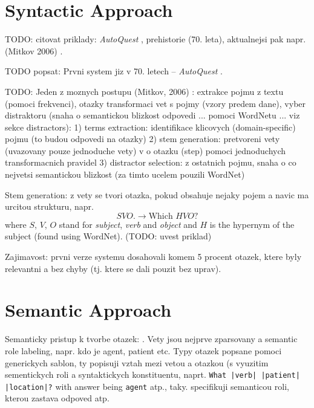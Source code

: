 \documentclass[a4paper, 12pt, twoside]{fithesis2}		%
\renewcommand{\_}{\leavevmode \kern0.0em\vbox{\hrule width0.4em}}
\begin{document}
\section{Syntactic Approach}
\label{sec:questions-syntactically}

TODO: citovat priklady: \textit{AutoQuest} \cite{questions-wolfe}, prehistorie (70. leta), aktualnejsi pak napr. (Mitkov 2006) \cite{question-gen-mitkov}.

TODO popsat: Prvni system jiz v 70. letech -- \textit{AutoQuest} \cite{questions-wolfe}.

TODO: Jeden z moznych postupu (Mitkov, 2006) \cite{question-gen-mitkov}:
extrakce pojmu z textu (pomoci frekvenci), otazky transformaci vet s pojmy (vzory predem dane), vyber distraktoru (snaha o semantickou blizkost odpovedi ... pomoci WordNetu ... viz sekce distractors):
1) terms extraction: identifikace klicovych (domain-specific) pojmu (to budou odpovedi na otazky)
2) stem generation: pretvoreni vety (uvazovany pouze jednoduche vety) v o otazku (step) pomoci jednoduchych transformacnich pravidel
3) distractor selection: z ostatnich pojmu, snaha o co nejvetsi semantickou blizkost (za timto ucelem pouzili WordNet)


Stem generation: z vety se tvori otazka, pokud obsahuje nejaky pojem a navic ma urcitou strukturu, napr.
$$
S V O \text{.} \longrightarrow \text{Which } H V O \text{?}
$$
where $S$, $V$, $O$ stand for \textit{subject}, \textit{verb} and \textit{object} and $H$ is the hypernym of the subject (found using WordNet). (TODO: uvest priklad)

Zajimavost: prvni verze systemu dosahovali komem 5 procent otazek, ktere byly relevantni a bez chyby (tj. ktere se dali pouzit bez uprav).


\section{Semantic Approach}
\label{sec:questions-semantically}

Semanticky pristup k tvorbe otazek: \cite{questions-eval}.
Vety jsou nejprve zparsovany a semantic role labeling, napr. kdo je agent, patient etc.
Typy otazek popsane pomoci generickych sablon, ty popisuji vztah mezi vetou a otazkou (s vyuzitim sementickych roli a syntaktickych konstituentu, naprt. \texttt{What |verb| |patient| |location|?} with answer being \texttt{agent} atp., taky. specifikuji semanticou roli, kterou zastava odpoved atp.
\end{document}
